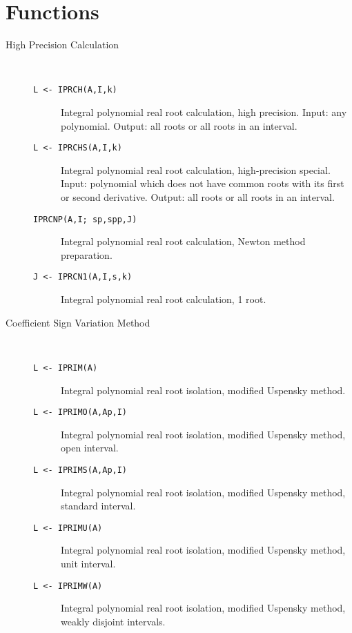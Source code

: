 \section{Functions}

\begin{description}
\item[High Precision Calculation] \ \
\begin{description}
\item[{\tt L <- IPRCH(A,I,k) 
}]  Integral polynomial real root calculation, high precision.
       Input: any polynomial. Output: all roots or all roots in an interval.

\item[{\tt L <- IPRCHS(A,I,k) 
}] Integral polynomial real root calculation, high-precision special.
       Input: polynomial which does not have common roots with its first or second
       derivative. Output: all roots or all roots in an interval.

\item[{\tt  IPRCNP(A,I; sp,spp,J) 
}] Integral polynomial real root calculation, Newton method preparation.

\item[{\tt J <- IPRCN1(A,I,s,k) 
}] Integral polynomial real root calculation, 1 root.

\end{description}

\item[Coefficient Sign Variation Method] \ \
\begin{description}
\item[{\tt L <- IPRIM(A) 
}]  Integral polynomial real root isolation, modified Uspensky method.
       
\item[{\tt L <- IPRIMO(A,Ap,I) 
}] Integral polynomial real root isolation, modified Uspensky method,
       open interval.

\item[{\tt L <- IPRIMS(A,Ap,I) 
}] Integral polynomial real root isolation, modified Uspensky method,
       standard interval.

\item[{\tt L <- IPRIMU(A) 
}] Integral polynomial real root isolation, modified Uspensky method,
       unit interval.

\item[{\tt L <- IPRIMW(A) 
}] Integral polynomial real root isolation, modified Uspensky method,
       weakly disjoint intervals.


\end{description}
\end{description}
